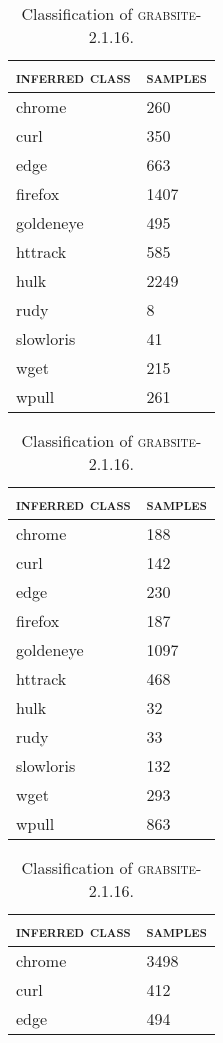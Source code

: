 \begin{table}[H]
	\centering
	\begin{subtable}{.45\linewidth}
		\centering
	\begin{tabular}{ll}
		\toprule
		\textsc{inferred class} & \textsc{samples}\\
		\midrule
		chrome & 260\\
		curl & 350\\
		edge & 663\\
		firefox & 1407\\
		goldeneye & 495\\
		httrack & 585\\
		hulk & 2249\\
		rudy & 8\\
		slowloris & 41\\
		wget & 215\\
		wpull & 261\\
		\bottomrule
	\end{tabular}
	\caption{Classification of \textsc{firefox-68.0}.}
	\end{subtable}
	\begin{subtable}{.45\linewidth}
		\centering
	\begin{tabular}{ll}
		\toprule
		\textsc{inferred class} & \textsc{samples}\\
		\midrule
		chrome & 188\\
		curl & 142\\
		edge & 230\\
		firefox & 187\\
		goldeneye & 1097\\
		httrack & 468\\
		hulk & 32\\
		rudy & 33\\
		slowloris & 132\\
		wget & 293\\
		wpull & 863\\
		\bottomrule
	\end{tabular}
	\caption{Classification of \textsc{grabsite-2.1.16}.}
	\end{subtable}
	\begin{subtable}{.45\linewidth}
		\centering
	\begin{tabular}{ll}
		\toprule
		\textsc{inferred class} & \textsc{samples}\\
		\midrule
		chrome & 3498\\
		curl & 412\\
		edge & 494\\

\end{tabular}
\end{subtable}
\end{table}
